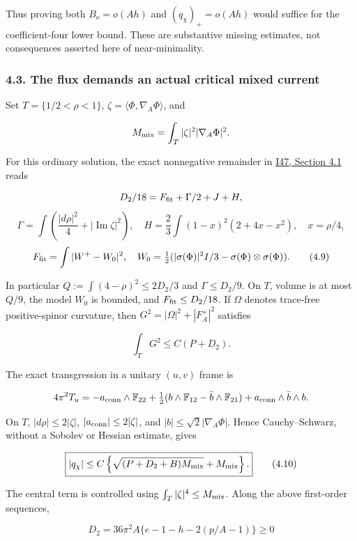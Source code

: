 \documentclass[
  11pt,
]{article}
\begin{document}
Thus proving both \(B_o=o(Ah)\) and \((q_\chi)_+=o(Ah)\) would suffice
for the coefficient-four lower bound. These are substantive missing
estimates, not consequences asserted here of near-minimality.

\hypertarget{the-flux-demands-an-actual-critical-mixed-current}{%
\subsubsection{4.3. The flux demands an actual critical mixed
current}\label{the-flux-demands-an-actual-critical-mixed-current}}

Set \(T=\{1/2<\rho<1\}\), \(\zeta=\langle\Phi,\nabla_A\Phi\rangle\), and

\[
 M_{\rm mix}=\int_T|\zeta|^2|\nabla_A\Phi|^2.
\]

For this ordinary solution, the exact nonnegative remainder in
\href{20260927_full_core_cost_and_extremal_metrics.md}{I47, Section 4.1}
reads

\[
 D_2/18=F_{\rm fit}+\Gamma/2+J+H,
\] \[
 \Gamma=\int\left(\frac{|d\rho|^2}{4}+|\operatorname{Im}\zeta|^2\right),
 \quad H=\frac23\int(1-x)^2(2+4x-x^2),\quad x=\rho/4,
\] \[
 F_{\rm fit}=\int|W^+-W_0|^2,\quad
 W_0=\tfrac12(|\sigma(\Phi)|^2I/3-\sigma(\Phi)\otimes\sigma(\Phi)).
 \tag{4.9}
\]

In particular \(Q:=\int(4-\rho)^2\le2D_2/3\) and \(\Gamma\le D_2/9\). On
\(T\), volume is at most \(Q/9\), the model \(W_0\) is bounded, and
\(F_{\rm fit}\le D_2/18\). If \(\Omega\) denotes trace-free
positive-spinor curvature, then \(G^2=|\Omega|^2+|F_A^+|^2\) satisfies

\[
 \int_TG^2\le C(P+D_2).
\]

The exact transgression in a unitary \((u,v)\) frame is

\[
 4\pi^2T_u=-a_{\rm conn}\wedge\mathbb F_{22}
 +\tfrac12(b\wedge\mathbb F_{12}-\bar b\wedge\mathbb F_{21})
 +a_{\rm conn}\wedge\bar b\wedge b.
\]

On \(T\), \(|d\rho|\le2|\zeta|\), \(|a_{\rm conn}|\le2|\zeta|\), and
\(|b|\le\sqrt2|\nabla_A\Phi|\). Hence Cauchy--Schwarz, without a Sobolev
or Hessian estimate, gives

\[
 \boxed{|q_\chi|\le
 C\left\{\sqrt{(P+D_2+B)M_{\rm mix}}+M_{\rm mix}\right\}.}
 \tag{4.10}
\]

The central term is controlled using \(\int_T|\zeta|^4\le M_{\rm mix}\).
Along the above first-order sequences,

\[
 D_2=36\pi^2A\{e-1-h-2(p/A-1)\}\ge0
\]
\end{document}
